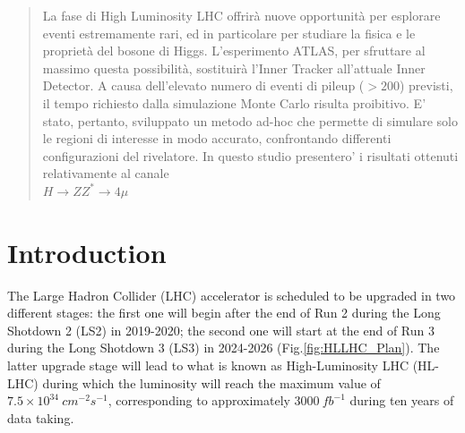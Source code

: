 \documentclass[a4paper,twoside,12pt]{article}
\begin{document}


\maketitle


\tableofcontents
\newpage

\begin{abstract}
La fase di High Luminosity LHC offrirà nuove opportunità per esplorare eventi estremamente rari, ed in particolare per studiare la fisica e le proprietà del bosone di Higgs.
L’esperimento ATLAS, per sfruttare al massimo questa possibilità, sostituirà l’Inner Tracker  all’attuale Inner Detector.
A causa dell'elevato numero di eventi di pileup ($>200$) previsti, il tempo richiesto dalla simulazione Monte Carlo risulta proibitivo. E’ stato, pertanto, sviluppato un metodo ad-hoc che permette di simulare solo le regioni di interesse in modo accurato, confrontando differenti configurazioni del rivelatore. In questo studio presentero' i risultati ottenuti relativamente al canale\\ {$H\rightarrow ZZ^*\rightarrow 4\mu$}
\end{abstract}

\newpage

\section{Introduction} \label{Introduction}
The Large Hadron Collider (LHC) accelerator is scheduled to be upgraded in two different stages: the first one will begin after the end of Run 2 during the Long Shotdown 2 (LS2) in 2019-2020; the second one will start at the end of Run 3 during the Long Shotdown 3 (LS3) in 2024-2026 (Fig.\ref{fig:HLLHC_Plan}). The latter upgrade stage will lead to what is known as High-Luminosity LHC (HL-LHC) during which the
luminosity will reach the maximum value of $7.5 \times 10^{34}\ cm^{-2}s^{-1}$, corresponding to approximately $3000\ fb^{-1}$ during ten years of data taking. \\
\end{document}
